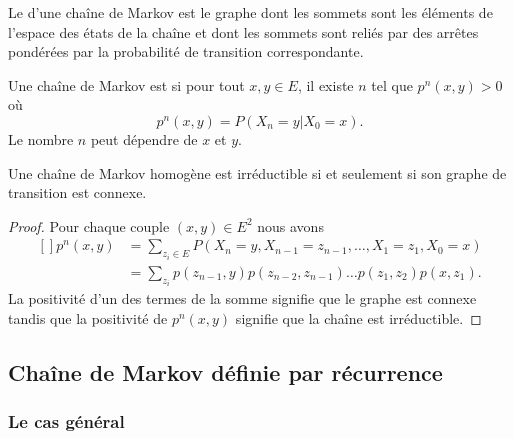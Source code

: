 Le  d'une chaîne de Markov est le graphe dont les sommets sont les éléments de l'espace des états de la chaîne et dont les sommets sont reliés par des arrêtes pondérées par la probabilité de transition correspondante.

\begin{definition}
    Une chaîne de Markov est  si pour tout \( x,y\in E\), il existe \( n\) tel que \( p^n(x,y)>0\) où 
    \begin{equation}
        p^n(x,y)=P(X_n=y|X_0=x).
    \end{equation}
    Le nombre \( n\) peut dépendre de \( x\) et \( y\).
\end{definition}

\begin{lemma}
    Une chaîne de Markov homogène est irréductible si et seulement si son graphe de transition est connexe.
\end{lemma}

\begin{proof}
    Pour chaque couple \( (x,y)\in E^2\) nous avons
    \begin{equation}
        \begin{aligned}[]
            p^n(x,y)&=\sum_{z_i\in E}P(X_n=y,X_{n-1}=z_{n-1},\ldots,X_1=z_1,X_0=x)\\
            &=\sum_{z_i}p(z_{n-1},y)p(z_{n-2},z_{n-1})\ldots p(z_1,z_2)p(x,z_1).
        \end{aligned}
    \end{equation}
    La positivité d'un des termes de la somme signifie que le graphe est connexe tandis que la positivité de \( p^n(x,y)\) signifie que la chaîne est irréductible.
\end{proof}

\subsection{Chaîne de Markov définie par récurrence}

\subsubsection{Le cas général}

